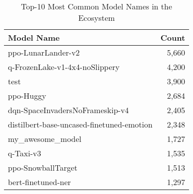 \begin{table}[]
\caption{Top-10 Most Common Model Names in the Ecosystem}
\label{tab:common_names}
\begin{tabular}{lr}
\hline
\textbf{Model Name} & \textbf{Count} \\ \hline
ppo-LunarLander-v2 & 5,660 \\
q-FrozenLake-v1-4x4-noSlippery & 4,200 \\
test & 3,900 \\
ppo-Huggy & 2,684 \\
dqn-SpaceInvadersNoFrameskip-v4 & 2,405 \\
distilbert-base-uncased-finetuned-emotion & 2,348 \\
my\_awesome\_model & 1,727 \\
q-Taxi-v3 & 1,535 \\
ppo-SnowballTarget & 1,513 \\
bert-finetuned-ner & 1,297\\
\hline
\end{tabular}%
\end{table}
